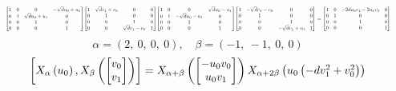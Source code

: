 \documentclass[11pt]{article}
\theoremstyle{definition}
\begin{document}
\[
\scaletoalign{\textwidth}{{\left[\begin{matrix}1 & 0 & 0 & - \sqrt{d} u_{0} + u_{1}\\0 & 1 & \sqrt{d} u_{0} + u_{1} & 0\\0 & 0 & 1 & 0\\0 & 0 & 0 & 1\end{matrix}\right]} {\left[\begin{matrix}1 & \sqrt{d} v_{1} + v_{0} & 0 & 0\\0 & 1 & 0 & 0\\0 & 0 & 1 & 0\\0 & 0 & \sqrt{d} v_{1} - v_{0} & 1\end{matrix}\right]} {\left[\begin{matrix}1 & 0 & 0 & \sqrt{d} u_{0} - u_{1}\\0 & 1 & - \sqrt{d} u_{0} - u_{1} & 0\\0 & 0 & 1 & 0\\0 & 0 & 0 & 1\end{matrix}\right]} {\left[\begin{matrix}1 & - \sqrt{d} v_{1} - v_{0} & 0 & 0\\0 & 1 & 0 & 0\\0 & 0 & 1 & 0\\0 & 0 & - \sqrt{d} v_{1} + v_{0} & 1\end{matrix}\right]} = {\left[\begin{matrix}1 & 0 & - 2 d u_{0} v_{1} - 2 u_{1} v_{0} & 0\\0 & 1 & 0 & 0\\0 & 0 & 1 & 0\\0 & 0 & 0 & 1\end{matrix}\right]}}
\]
\[
\alpha = \left( 2, \  0, \  0, \  0\right), \quad \beta = \left( -1, \  -1, \  0, \  0\right)
\]
\[
\scaletoalign{\textwidth}{\left[ X_{\alpha}\left(u_{0}\right), X_{\beta}\left(\left[\begin{matrix}v_{0}\\v_{1}\end{matrix}\right]\right) \right] = X_{\alpha + \beta}\left(\left[\begin{matrix}- u_{0} v_{0}\\u_{0} v_{1}\end{matrix}\right]\right) X_{\alpha + 2\beta}\left(u_{0} \left(- d v_{1}^{2} + v_{0}^{2}\right)\right)}
\]
\end{document}
